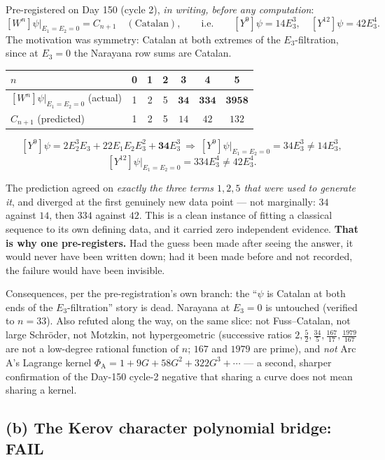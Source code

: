 \documentclass[11pt,a4paper]{article}
\theoremstyle{plain}
\theoremstyle{definition}
\begin{document}
Pre-registered on Day 150 (cycle 2), \emph{in writing, before any computation}:
\[
[W^n]\psi\big|_{E_1=E_2=0}=C_{n+1}\quad(\text{Catalan}),
\qquad\text{i.e.}\qquad [Y^9]\psi=14E_3^3,\quad [Y^{12}]\psi=42E_3^4 .
\]
The motivation was symmetry: Catalan at both extremes of the $E_3$-filtration, since at
$E_3=0$ the Narayana row sums are Catalan.

\begin{center}
\begin{tabular}{@{}l|cccccc@{}}
\toprule
$n$ & 0 & 1 & 2 & 3 & 4 & 5\\
\midrule
$[W^n]\psi|_{E_1=E_2=0}$ (actual) & 1 & 2 & 5 & $\mathbf{34}$ & $\mathbf{334}$ & $\mathbf{3958}$\\
$C_{n+1}$ (predicted) & 1 & 2 & 5 & $14$ & $42$ & $132$\\
\bottomrule
\end{tabular}
\end{center}

\[
[Y^9]\psi=2E_2^3E_3+22E_1E_2E_3^2+\mathbf{34}E_3^3
\ \Longrightarrow\ [Y^9]\psi\big|_{E_1=E_2=0}=34E_3^3\neq14E_3^3,
\]
\[
[Y^{12}]\psi\big|_{E_1=E_2=0}=334E_3^4\neq42E_3^4 .
\]

The prediction agreed on \emph{exactly the three terms $1,2,5$ that were used to generate
it}, and diverged at the first genuinely new data point --- not marginally: $34$ against
$14$, then $334$ against $42$. This is a clean instance of fitting a classical sequence to
its own defining data, and it carried zero independent evidence. \textbf{That is why one
pre-registers.} Had the guess been made after seeing the answer, it would never have been
written down; had it been made before and not recorded, the failure would have been
invisible.

Consequences, per the pre-registration's own branch: the ``$\psi$ is Catalan at both ends
of the $E_3$-filtration'' story is dead. Narayana at $E_3=0$ is untouched (verified to
$n=33$). Also refuted along the way, on the same slice: not Fuss--Catalan, not large
Schr\"oder, not Motzkin, not hypergeometric (successive ratios
$2,\tfrac52,\tfrac{34}5,\tfrac{167}{17},\tfrac{1979}{167}$ are not a low-degree rational
function of $n$; $167$ and $1979$ are prime), and \emph{not} Arc A's Lagrange kernel
$\Phi_{\mathrm A}=1+9G+58G^2+322G^3+\cdots$ --- a second, sharper confirmation of the
Day-150 cycle-2 negative that sharing a curve does not mean sharing a kernel.

\subsection{(b) The Kerov character polynomial bridge: \textbf{FAIL}}
\end{document}
